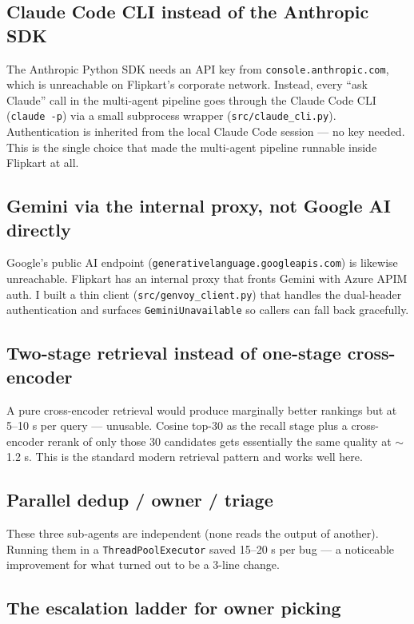 \documentclass[11pt,a4paper]{article}
\begin{document}
\subsection{Claude Code CLI instead of the Anthropic SDK}

The Anthropic Python SDK needs an API key from
\texttt{console.anthropic.com}, which is unreachable on Flipkart's
corporate network. Instead, every ``ask Claude'' call in the multi-agent
pipeline goes through the Claude Code CLI (\texttt{claude -p}) via a small
subprocess wrapper (\texttt{src/claude\_cli.py}). Authentication is
inherited from the local Claude Code session --- no key needed. This is
the single choice that made the multi-agent pipeline runnable inside
Flipkart at all.

\subsection{Gemini via the internal proxy, not Google AI directly}

Google's public AI endpoint (\texttt{generativelanguage.googleapis.com})
is likewise unreachable. Flipkart has an internal proxy that fronts Gemini
with Azure APIM auth. I built a thin client (\texttt{src/genvoy\_client.py})
that handles the dual-header authentication and surfaces
\texttt{GeminiUnavailable} so callers can fall back gracefully.

\subsection{Two-stage retrieval instead of one-stage cross-encoder}

A pure cross-encoder retrieval would produce marginally better rankings
but at 5--10 s per query --- unusable. Cosine top-30 as the recall stage
plus a cross-encoder rerank of only those 30 candidates gets essentially
the same quality at $\sim$1.2 s. This is the standard modern retrieval
pattern and works well here.

\subsection{Parallel dedup / owner / triage}

These three sub-agents are independent (none reads the output of another).
Running them in a \texttt{ThreadPoolExecutor} saved 15--20 s per bug --- a
noticeable improvement for what turned out to be a 3-line change.

\subsection{The escalation ladder for owner picking}
\end{document}
